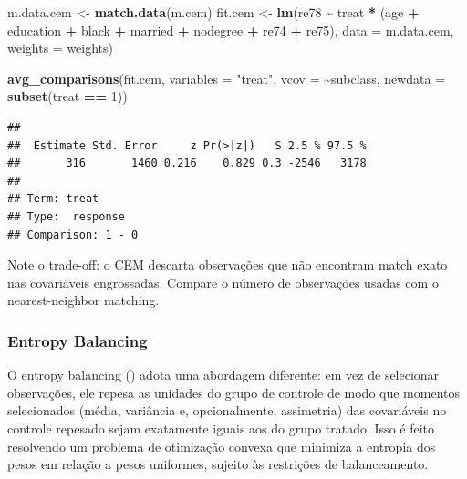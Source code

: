 \documentclass[
]{article}
\newenvironment{Shaded}{\begin{snugshade}}{\end{snugshade}}
\newcommand{\AttributeTok}[1]{\textcolor[rgb]{0.13,0.29,0.53}{#1}}
\newcommand{\DecValTok}[1]{\textcolor[rgb]{0.00,0.00,0.81}{#1}}
\newcommand{\FunctionTok}[1]{\textcolor[rgb]{0.13,0.29,0.53}{\textbf{#1}}}
\newcommand{\NormalTok}[1]{#1}
\newcommand{\OtherTok}[1]{\textcolor[rgb]{0.56,0.35,0.01}{#1}}
\newcommand{\SpecialCharTok}[1]{\textcolor[rgb]{0.81,0.36,0.00}{\textbf{#1}}}
\newcommand{\StringTok}[1]{\textcolor[rgb]{0.31,0.60,0.02}{#1}}
\begin{document}
\begin{Shaded}
\begin{Highlighting}[]
\NormalTok{m.data.cem }\OtherTok{\textless{}{-}} \FunctionTok{match.data}\NormalTok{(m.cem)}
\NormalTok{fit.cem }\OtherTok{\textless{}{-}} \FunctionTok{lm}\NormalTok{(re78 }\SpecialCharTok{\textasciitilde{}}\NormalTok{ treat }\SpecialCharTok{*}\NormalTok{ (age }\SpecialCharTok{+}\NormalTok{ education }\SpecialCharTok{+}\NormalTok{ black }\SpecialCharTok{+}\NormalTok{ married }\SpecialCharTok{+}
\NormalTok{                                nodegree }\SpecialCharTok{+}\NormalTok{ re74 }\SpecialCharTok{+}\NormalTok{ re75),}
              \AttributeTok{data =}\NormalTok{ m.data.cem, }\AttributeTok{weights =}\NormalTok{ weights)}

\FunctionTok{avg\_comparisons}\NormalTok{(fit.cem, }\AttributeTok{variables =} \StringTok{"treat"}\NormalTok{,}
                \AttributeTok{vcov =} \SpecialCharTok{\textasciitilde{}}\NormalTok{subclass, }\AttributeTok{newdata =} \FunctionTok{subset}\NormalTok{(treat }\SpecialCharTok{==} \DecValTok{1}\NormalTok{))}
\end{Highlighting}
\end{Shaded}

\begin{verbatim}
## 
##  Estimate Std. Error     z Pr(>|z|)   S 2.5 % 97.5 %
##       316       1460 0.216    0.829 0.3 -2546   3178
## 
## Term: treat
## Type:  response 
## Comparison: 1 - 0
\end{verbatim}

Note o trade-off: o CEM descarta observações que não encontram match exato nas covariáveis engrossadas. Compare o número de observações usadas com o nearest-neighbor matching.

\subsubsection{Entropy Balancing}\label{entropy-balancing}

O entropy balancing () adota uma abordagem diferente: em vez de selecionar observações, ele repesa as unidades do grupo de controle de modo que momentos selecionados (média, variância e, opcionalmente, assimetria) das covariáveis no controle repesado sejam exatamente iguais aos do grupo tratado. Isso é feito resolvendo um problema de otimização convexa que minimiza a entropia dos pesos em relação a pesos uniformes, sujeito às restrições de balanceamento.
\end{document}
